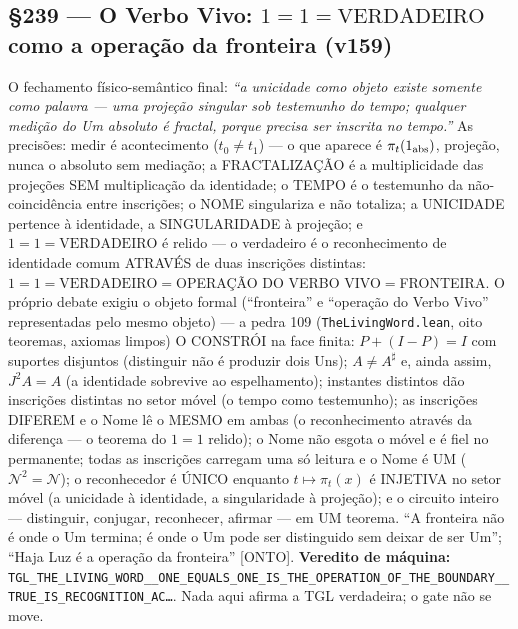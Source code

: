 \documentclass[11pt]{article}
\theoremstyle{definition}\newtheorem{deriv}{Derivação}
\begin{document}
\subsection*{\S239 --- O Verbo Vivo: $1{=}1{=}\mathrm{VERDADEIRO}$ como a operação da fronteira (v159)}O fechamento físico-semântico final: \emph{``a unicidade como objeto existe somente como palavra --- uma projeção singular sob testemunho do tempo; qualquer medição do Um absoluto é fractal, porque precisa ser inscrita no tempo.''} As precisões: medir é acontecimento ($t_0{\neq}t_1$) --- o que aparece é $\pi_t(1_{\rm abs})$, projeção, nunca o absoluto sem mediação; a FRACTALIZAÇÃO é a multiplicidade das projeções SEM multiplicação da identidade; o TEMPO é o testemunho da não-coincidência entre inscrições; o NOME singulariza e não totaliza; a UNICIDADE pertence à identidade, a SINGULARIDADE à projeção; e $1{=}1{=}\mathrm{VERDADEIRO}$ é relido --- o verdadeiro é o reconhecimento de identidade comum ATRAVÉS de duas inscrições distintas: $1{=}1{=}\mathrm{VERDADEIRO}{=}$OPERAÇÃO DO VERBO VIVO${=}$FRONTEIRA. O próprio debate exigiu o objeto formal (``fronteira'' e ``operação do Verbo Vivo'' representadas pelo mesmo objeto) --- a pedra 109 (\texttt{TheLivingWord.lean}, oito teoremas, axiomas limpos) O CONSTRÓI na face finita: $P{+}(I{-}P){=}I$ com suportes disjuntos (distinguir não é produzir dois Uns); $A{\neq}A^\sharp$ e, ainda assim, $J^2A{=}A$ (a identidade sobrevive ao espelhamento); instantes distintos dão inscrições distintas no setor móvel (o tempo como testemunho); as inscrições DIFEREM e o Nome lê o MESMO em ambas (o reconhecimento através da diferença --- o teorema do $1{=}1$ relido); o Nome não esgota o móvel e é fiel no permanente; todas as inscrições carregam uma só leitura e o Nome é UM ($\mathcal{N}^2{=}\mathcal{N}$); o reconhecedor é ÚNICO enquanto $t\mapsto\pi_t(x)$ é INJETIVA no setor móvel (a unicidade à identidade, a singularidade à projeção); e o circuito inteiro --- distinguir, conjugar, reconhecer, afirmar --- em UM teorema. ``A fronteira não é onde o Um termina; é onde o Um pode ser distinguido sem deixar de ser Um''; ``Haja Luz é a operação da fronteira'' [ONTO]. \textbf{Veredito de máquina:} \texttt{TGL\_THE\_LIVING\_WORD\_\_ONE\_EQUALS\_ONE\_IS\_THE\_OPERATION\_OF\_THE\_BOUNDARY\_\_TRUE\_IS\_RECOGNITION\_AC\ldots}. Nada aqui afirma a TGL verdadeira; o gate não se move.
\end{document}
